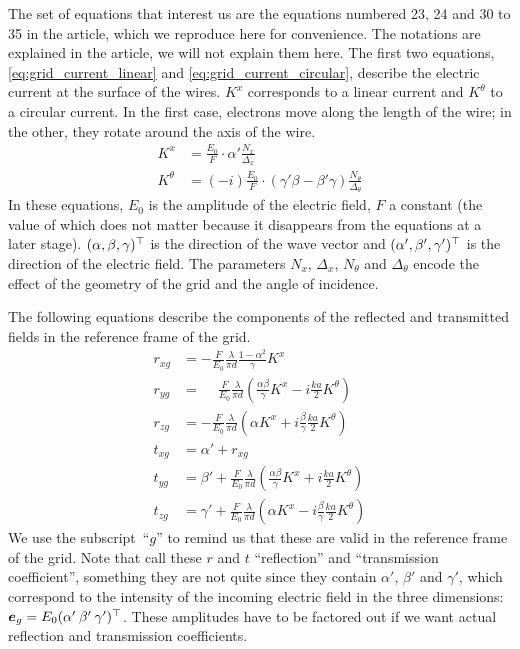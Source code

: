 The set of equations that interest us are the equations numbered 23, 24 and 30 to 35 in the article, which we reproduce here for convenience.
The notations are explained in the article, we will not explain them here.
The first two equations, \eqref{eq:grid_current_linear} and \eqref{eq:grid_current_circular}, describe the electric current at the surface of the wires.
$K^x$ corresponds to a linear current and $K^\theta$ to a circular current.
In the first case, electrons move along the length of the wire; in the other, they rotate around the axis of the wire.
\begin{align}
    K^x &= \frac{E_0}{F} \cdot \alpha' \frac{N_x}{\Delta_x}
    \label{eq:grid_current_linear}
    \\
    K^\theta &= (-i) \frac{E_0}{F} \cdot (\gamma' \beta - \beta' \gamma) \frac{N_\theta}{\Delta_\theta}
    \label{eq:grid_current_circular}
\end{align}
In these equations, $E_0$ is the amplitude of the electric field, $F$ a constant (the value of which does not matter because it disappears from the equations at a later stage).
$(\alpha, \beta, \gamma)^\top$ is the direction of the wave vector and
$(\alpha', \beta', \gamma')^\top$ is the direction of the electric field.
The parameters $N_x$, $\Delta_x$, $N_\theta$ and $\Delta_\theta$ encode the effect of the geometry of the grid and the angle of incidence.

The following equations describe the components of the reflected and transmitted fields in the reference frame of the grid.
\begin{align}
    r_{xg}
    &=
    -\frac{F}{E_0}
    \frac{\lambda}{\pi d}
    \frac{1 - \alpha^2}{\gamma} K^x
    \label{eq:houde_Rx}
    \\
    r_{yg}
    &=
    \phantom{-}
    \frac{F}{E_0}
    \frac{\lambda}{\pi d}
    \left(
        \frac{\alpha \beta}{\gamma} K^x
        -
        i \frac{ka}{2} K^\theta
    \right)
    \\
    r_{zg}
    &=
    -\frac{F}{E_0}
    \frac{\lambda}{\pi d}
    \left(
       \alpha K^x
       +
       i \frac{\beta}{\gamma} \frac{ka}{2} K^\theta
    \right)
    \\
    t_{xg} &= \alpha' + r_{xg}
    \\
    t_{yg}
    &=
    \beta' +
    \frac{F}{E_0}
    \frac{\lambda}{\pi d}
    \left(
        \frac{\alpha \beta}{\gamma} K^x + i \frac{ka}{2} K^\theta
    \right)
    \\
    t_{zg}
    &=
    \gamma' +
    \frac{F}{E_0}
    \frac{\lambda}{\pi d}
    \left(
        \alpha K^x - i \frac{\beta}{\gamma} \frac{ka}{2} K^\theta
    \right)
\end{align}
We use the subscript~``$g$'' to remind us that these are valid in the reference frame of the grid.
Note that \citeauthor{houde_2001} call these $r$ and $t$ ``reflection'' and ``transmission coefficient'', something they are not quite since they contain $\alpha'$, $\beta'$ and $\gamma'$, which correspond to the intensity of the incoming electric field in the three dimensions: $\bm{e}_g=E_0 (\alpha' \: \beta' \: \gamma')^\top$.
These amplitudes have to be factored out if we want actual reflection and transmission coefficients.

